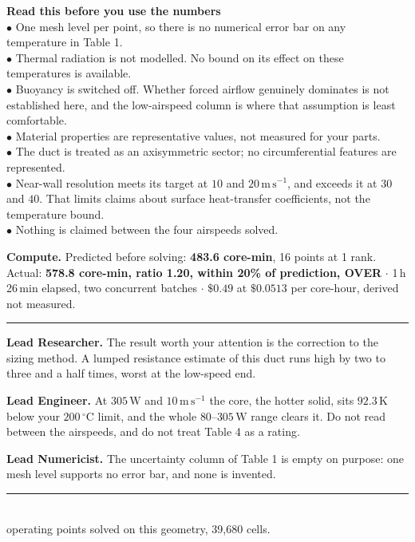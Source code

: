 \documentclass[9pt,a4paper]{article}
\renewcommand{\footnotesize}{\fontsize{6.9}{7.9}\selectfont}
\renewcommand{\scriptsize}{\fontsize{6.4}{7.5}\selectfont}
\newcommand{\rolesig}[1]{\textbf{\footnotesize#1}}
\begin{document}
\begin{minipage}[t]{0.375\textwidth}
\vspace{0pt}
\colorbox{boxgrey}{\begin{minipage}{0.955\textwidth}
{\footnotesize\textbf{Read this before you use the numbers}\\[1pt]
$\bullet$ One mesh level per point, so there is no numerical error bar on any
temperature in Table 1.\\
$\bullet$ Thermal radiation is not modelled. No bound on its effect on these
temperatures is available.\\
$\bullet$ Buoyancy is switched off. Whether forced airflow genuinely dominates
is not established here, and the low-airspeed column is where that assumption
is least comfortable.\\
$\bullet$ Material properties are representative values, not measured for your
parts.\\
$\bullet$ The duct is treated as an axisymmetric sector; no circumferential
features are represented.\\
$\bullet$ Near-wall resolution meets its target at $10$ and
$20\,\mathrm{m\,s^{-1}}$, and exceeds it at $30$ and $40$. That limits claims
about surface heat-transfer coefficients, not the temperature bound.\\
$\bullet$ Nothing is claimed between the four airspeeds solved.}
\end{minipage}}
\end{minipage}

\vspace{2pt}
{\footnotesize\textbf{Compute.} Predicted before solving:
\textbf{483.6 core-min}, 16 points at 1 rank. Actual: \textbf{578.8 core-min,
ratio 1.20, within 20\% of prediction, OVER} $\cdot$ 1\,h\,26\,min elapsed,
two concurrent batches $\cdot$ $\$0.49$ at $\$0.0513$ per core-hour, derived
not measured.}

\vspace{2pt}
{\color{rulegrey}\rule{\textwidth}{0.5pt}}

\vspace{1pt}
{\footnotesize
\rolesig{Lead Researcher.} The result worth your attention is the correction
to the sizing method. A lumped resistance estimate of this duct runs high by two
to three and a half times, worst at the low-speed end.

\rolesig{Lead Engineer.} At $305\,\mathrm{W}$ and $10\,\mathrm{m\,s^{-1}}$
the core, the hotter solid, sits $92.3\,\mathrm{K}$ below your
$200\,^{\circ}\mathrm{C}$ limit, and the whole $80$--$305\,\mathrm{W}$ range
clears it. Do not read between the airspeeds, and do not treat Table 4 as a
rating.

\rolesig{Lead Numericist.} The uncertainty column of Table 1 is empty on
purpose: one mesh level supports no error bar, and none is invented.}

\vspace{1pt}
{\color{rulegrey}\rule{\textwidth}{0.4pt}}\\[0.5pt]
{\scriptsize 16 operating points solved on this geometry, 39,680 cells.}
\end{document}
